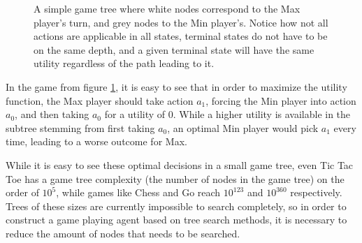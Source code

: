 \begin{figure}[H]
    \centering
    

    \caption{A simple game tree where white nodes correspond to the
    Max player's turn, and grey nodes to the Min player's. Notice how
    not all actions are applicable in all states, terminal states do
    not have to be on the same depth, and a given terminal state will have
    the same utility regardless of the path leading to it.}
    \label{fig:game_tree}

\end{figure}


In the game from figure \ref{fig:game_tree}, it is easy to see that in
order to maximize the utility function, the Max player should take action
$a_1$, forcing the Min player into action $a_0$, and then taking $a_0$
for a utility of $0$. While a higher utility is available in the subtree
stemming from first taking $a_0$, an optimal Min player would pick $a_1$
every time, leading to a worse outcome for Max.

While it is easy to see these optimal decisions in a small game tree, even
Tic Tac Toe has a game tree complexity (the number of nodes in the game 
tree) on the order of $10^5$, while games like Chess and Go reach 
$10^{123}$ and $10^{360}$ respectively. Trees of these sizes are currently
impossible to search completely, so in order to construct a game playing
agent based on tree search methods, it is necessary to reduce the amount
of nodes that needs to be searched.

